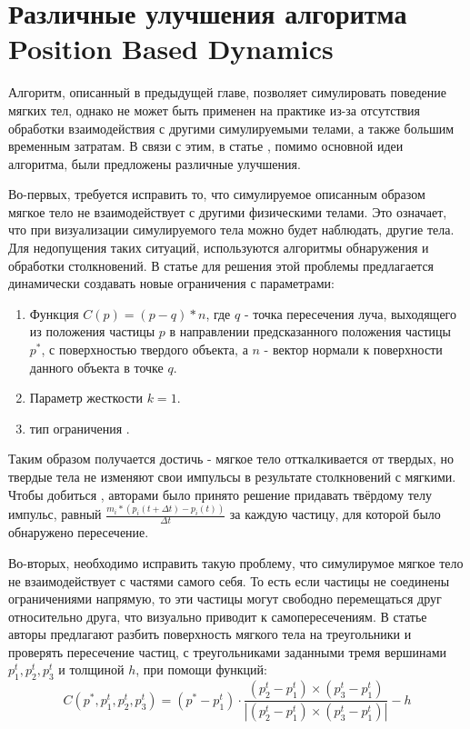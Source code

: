 \section{Различные улучшения алгоритма Position Based Dynamics} \label{ch2:pbd-improvments} %
	Алгоритм, описанный в предыдущей главе, позволяет симулировать поведение мягких тел, однако не может быть применен на практике из-за отсутствия обработки взаимодействия с другими симулируемыми телами, а также большим временным затратам. В связи с этим, в статье \cite{pbd}, помимо основной идеи алгоритма, были предложены различные улучшения.
	
	Во-первых, требуется исправить то, что симулируемое описанным образом мягкое тело не взаимодействует с другими физическими телами. Это означает, что при визуализации симулируемого тела можно будет наблюдать,  другие тела. Для недопущения таких ситуаций, используются алгоритмы обнаружения и обработки столкновений. В статье \cite{pbd} для решения этой проблемы предлагается динамически создавать новые ограничения с параметрами:
	\begin{enumerate}[1.]
		\item Функция $C(p) = (p - q) * n$, где $q$ - точка пересечения луча, выходящего из положения частицы $p$ в направлении предсказанного положения частицы $p^*$, с поверхностью твердого объекта, а $n$ - вектор нормали к поверхности данного объекта в точке $q$.
		\item Параметр жесткости $k = 1$.
		\item тип ограничения .
	\end{enumerate}
	
	Таким образом получается достичь  - мягкое тело отткалкивается от твердых, но твердые тела не изменяют свои импульсы в результате столкновений с мягкими. Чтобы добиться , авторами было принято решение придавать твёрдому телу импульс, равный $\frac{m_i*(p_i(t + \Delta t) - p_i(t))}{\Delta t}$ за каждую частицу, для которой было обнаружено пересечение.
		
	Во-вторых, необходимо исправить такую проблему, что симулирумое мягкое тело не взаимодействует с частями самого себя. То есть если частицы не соединены ограничениями напрямую, то эти частицы могут свободно перемещаться друг относительно друга, что визуально приводит к самопересечениям. В статье \cite{pbd} авторы предлагают разбить поверхность мягкого тела на треугольники и проверять пересечение частиц, с треугольниками заданными тремя вершинами $p_1^t, p_2^t, p_3^t$ и толщиной $h$, при помощи функций:
	\begin{equation}
		C(p^*, p_1^t, p_2^t, p_3^t) = (p^* - p_1^t) \cdot \frac{(p_2^t - p_1^t) \times (p_3^t - p_1^t)}{|(p_2^t - p_1^t) \times (p_3^t - p_1^t)|} - h
	\end{equation}
	
